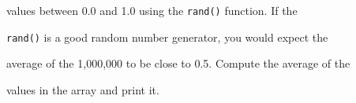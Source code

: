 values between 0.0 and 1.0 using the \texttt{rand()} function. If the

\texttt{rand()} is a good random number generator, you would expect the

average of the 1,000,000 to be close to 0.5. Compute the average of the

values in the array and print it.

